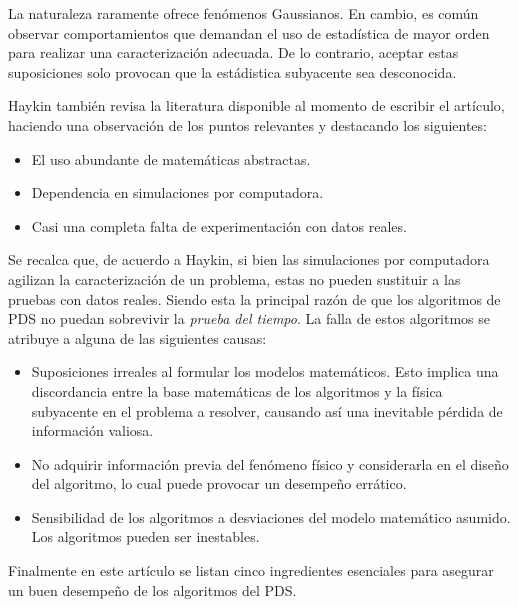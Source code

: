 \documentclass[11pt, twocolumn]{article}
\begin{document}
La naturaleza raramente ofrece fenómenos Gaussianos. En cambio, es común observar comportamientos que demandan el uso de estadística de mayor orden para realizar una caracterización adecuada. De lo contrario, aceptar estas suposiciones solo provocan que la estádistica subyacente sea desconocida.

Haykin también revisa la literatura disponible al momento de escribir el artículo, haciendo una observación de los puntos relevantes y destacando los siguientes:

\begin{itemize}
    \item El uso abundante de matemáticas abstractas.
    \item Dependencia en simulaciones por computadora.
    \item Casi una completa falta de experimentación con datos reales.
\end{itemize}

Se recalca que, de acuerdo a Haykin, si bien las simulaciones por computadora agilizan la caracterización de un problema, estas no pueden sustituir a las pruebas con datos reales. Siendo esta la principal razón de que los algoritmos de PDS no puedan sobrevivir la \textit{prueba del tiempo}. La falla de estos algoritmos se atribuye a alguna de las siguientes causas:

\begin{itemize}
    \item Suposiciones irreales al formular los modelos matemáticos. Esto implica una discordancia entre la base matemáticas de los algoritmos y la física subyacente en el problema a resolver, causando así una inevitable pérdida de información valiosa.
    \item No adquirir información previa del fenómeno físico y considerarla en el diseño del algoritmo, lo cual puede provocar un desempeño errático.
    \item Sensibilidad de los algoritmos a desviaciones del modelo matemático asumido. Los algoritmos pueden ser inestables.
\end{itemize}

Finalmente en este artículo se listan cinco ingredientes esenciales para asegurar un buen desempeño de los algoritmos del PDS.
\end{document}
